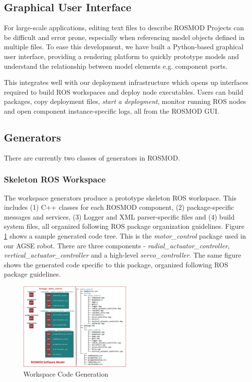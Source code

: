 \subsection{Graphical User Interface}

For large-scale applications, editing text files to describe ROSMOD Projects can be difficult and error prone, especially when referencing model objects defined in multiple files. To ease this development, we have built a Python-based graphical user interface, providing a rendering platform to quickly prototype models and understand the relationship between model elements e.g. component ports. 

This integrates well with our deployment infrastructure which opens up interfaces required to build ROS workspaces and deploy node executables. Users can build packages, copy deployment files,  \emph{start a deployment}, monitor running ROS nodes and open component instance-specific logs, all from the ROSMOD GUI.

\subsection{Generators} 

There are currently two classes of generators in ROSMOD. 

\subsubsection{Skeleton ROS Workspace}
\label{sec:generation}

The workspace generators produce a prototype skeleton ROS workspace. This includes (1) C++ classes for each ROSMOD component, (2) package-specific messages and services, (3) Logger and XML parser-specific files and (4) build system files, all organized following ROS package organization guidelines. Figure \ref{fig:Code_Generation} shows a sample generated code tree. This is the \emph{motor\_control} package used in our AGSE robot. There are three components - \emph{radial\_actuator\_controller}, \emph{vertical\_actuator\_controller} and a high-level \emph{servo\_controller}. The same figure shows the generated code specific to this package, organized following ROS package guidelines.

\begin{figure}[h]
	\centering
	\includegraphics[width=0.50\textwidth]{figs/Code_Generation.png}
	\caption{Workspace Code Generation}
	\label{fig:Code_Generation}
\end{figure}

